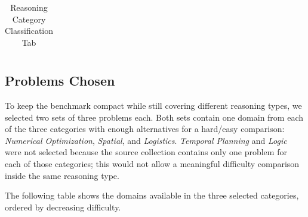 \begin{table}[H]
\begin{tabular}{c|c}
        \end{tabular}
        \vspace{0.2cm}
        \caption{Reasoning Category Classification Tab}
        \label{tab:reasoning-category-classification}
    \end{table}

\subsection{Problems Chosen}

To keep the benchmark compact while still covering different reasoning types, we selected two sets of three problems each. Both sets contain one domain from each of the three categories with enough alternatives for a hard/easy comparison: \textit{Numerical Optimization}, \textit{Spatial}, and \textit{Logistics}. \textit{Temporal Planning} and \textit{Logic} were not selected because the source collection contains only one problem for each of those categories; this would not allow a meaningful difficulty comparison inside the same reasoning type.

The following table shows the domains available in the three selected categories, ordered by decreasing difficulty.

